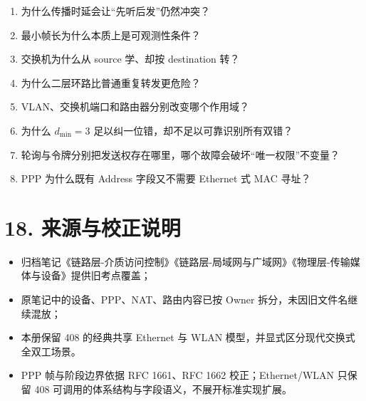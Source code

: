 \documentclass[UTF8,fontset=none,11pt,a4paper]{ctexart}
\providecommand{\tightlist}{\setlength{\itemsep}{0pt}\setlength{\parskip}{0pt}}
\begin{document}
\begin{enumerate}
\def\labelenumi{\arabic{enumi}.}
\tightlist
\item
  为什么传播时延会让``先听后发''仍然冲突？
\item
  最小帧长为什么本质上是可观测性条件？
\item
  交换机为什么从 source 学、却按 destination 转？
\item
  为什么二层环路比普通重复转发更危险？
\item
  VLAN、交换机端口和路由器分别改变哪个作用域？
\item
  为什么 $d_{\min}=3$ 足以纠一位错，却不足以可靠识别所有双错？
\item
  轮询与令牌分别把发送权存在哪里，哪个故障会破坏“唯一权限”不变量？
\item
  PPP 为什么既有 Address 字段又不需要 Ethernet 式 MAC 寻址？
\end{enumerate}

\section{18.
来源与校正说明}\label{15-ux6765ux6e90ux4e0eux6821ux6b63ux8bf4ux660e}

\begin{itemize}
\tightlist
\item
  归档笔记《链路层-介质访问控制》《链路层-局域网与广域网》《物理层-传输媒体与设备》提供旧考点覆盖；
\item
  原笔记中的设备、PPP、NAT、路由内容已按 Owner
  拆分，未因旧文件名继续混放；
\item
  本册保留 408 的经典共享 Ethernet 与 WLAN
  模型，并显式区分现代交换式全双工场景。
\item
  PPP 帧与阶段边界依据 RFC 1661、RFC 1662 校正；Ethernet/WLAN 只保留 408 可调用的体系结构与字段语义，不展开标准实现扩展。
\end{itemize}
\end{document}

